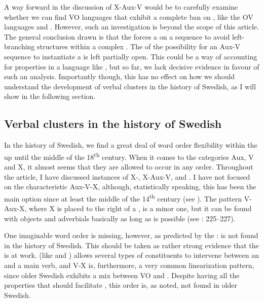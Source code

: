 \documentclass[output=paper, colorlinks, citecolor=brown]{langscibook}
\begin{document}
A way forward in the discussion of X-Aux-V would be to carefully examine whether we can find VO languages that exhibit a complete ban on , like the OV languages  and . However, such an investigation is beyond the scope of this article. The general conclusion drawn is that the  forces a  on a  sequence to avoid left-branching structures within a complex . The  of the possibility for an Aux-V sequence to instantiate a  is left partially open. This could be a way of accounting for  properties in a language like , but so far, we lack decisive evidence in favour of such an analysis. Importantly though, this  has no effect on how we should understand the development of verbal clusters in the history of Swedish, as I will show in the following section.


\subsection{Verbal clusters in the history of Swedish}\label{sec:sangfelt:5.3}

In the history of Swedish, we find a great deal of word order flexibility within the  up until the middle of the 18\textsuperscript{th} century. When it comes to the categories Aux, V and X, it almost seems that they are allowed to occur in any order. Throughout the article, I have discussed instances of X-, X-Aux-V, and . I have not focused on the characteristic  Aux-V-X, although, statistically speaking, this has been the main option since at least the middle of the 14\textsuperscript{th} century (see \citealt{Delsing1999,Petzell2011,Sangfelt2019}). The pattern V-Aux-X, where X is placed to the right of a , is a minor one, but it can be found with objects and adverbials basically as long as  is possible (see \citealt{Sangfelt2019}: 225–227).


One imaginable word order is missing, however, as predicted by the :  is not found in the history of Swedish. This should be taken as rather strong evidence that the  is at work.  (like  and ) allows several types of constituents to intervene between an  and a main verb, and V-X is, furthermore, a very common linearization pattern, since older Swedish exhibits a mix between VO and . Despite having all the properties that should facilitate , this order is, as noted, not found in older Swedish.
\end{document}
